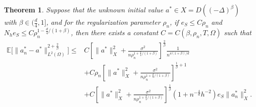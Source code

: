 \documentclass[11pt]{article}
\newtheorem{theorem}{Theorem}
\numberwithin{equation}{section}
\begin{document}
\begin{theorem}\label{thm-E-condi}
Suppose that the unknown initial value $a^*\in X=D((-\Delta)^\beta)$ with $\beta\in(\frac{d}{4},1]$, and for the regularization parameter $\rho_n$, if $e_S\leq C\rho_n$ and $N_he_S\leq C\rho_n^{1-\frac{d}4/(1+\beta)}$, then there exists a constant $C=C(\beta,\rho_n,T,\Omega)$ such that
\[
\begin{aligned}
\mathbb{E} \bigl[ \| a_n^* - a^* \|^{2+\frac{2}{\beta}}_{L^2(\Omega)} \bigr] 
\le & C\left[ \| a^* \|^2_{X} + \frac{\sigma^2}{n \rho_n^{1 + \frac{d}4/(1+\beta)}}\right]^{\frac2\beta} \frac1{n^{4(1+\beta)/d}} \\
&+ C\rho_n\left[ \| a^* \|^2_{X} + \frac{\sigma^2}{n \rho_n^{1 + \frac{d}4/(1+\beta)}}\right]^{\frac1\beta+1}\\
&+C\left[ \| a^* \|^2_{X} + \frac{\sigma^2}{n \rho_n^{1 + \frac{d}4/(1+\beta)}}\right]^{\frac1\beta}\left(1+n^{-\frac4d}h^{-2}\right)e_S\|a_n^*\|^2_X.
\end{aligned}
\]
\end{theorem}
\end{document}
